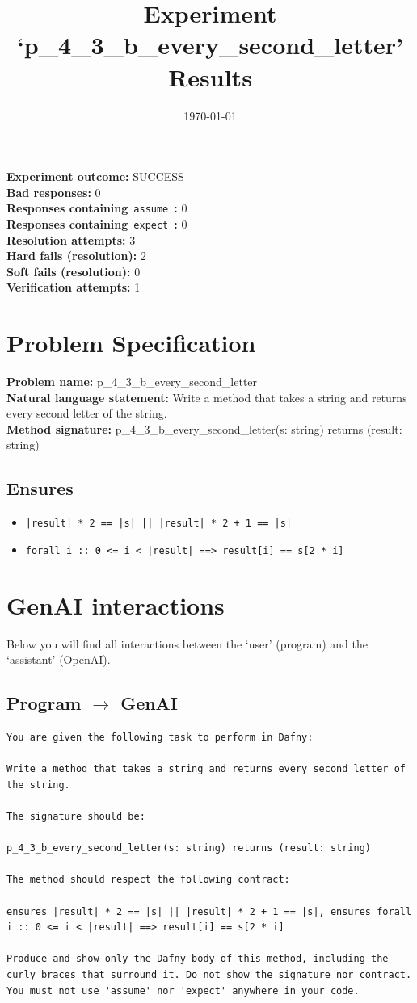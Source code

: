 \documentclass{article}
\begin{document}
\title{Experiment `p\_4\_3\_b\_every\_second\_letter' Results}
\author{\today}
\date{}
\maketitle
\textbf{Experiment outcome: }SUCCESS
\\\textbf{Bad responses: }0
\\\textbf{Responses containing}~\texttt{assume}~\textbf{: }0
\\\textbf{Responses containing}~\texttt{expect}~\textbf{: }0
\\\textbf{Resolution attempts: }3
\\\textbf{Hard fails (resolution): }2
\\\textbf{Soft fails (resolution): }0
\\\textbf{Verification attempts: }1
\section*{Problem Specification}
\textbf{Problem name: }p\_4\_3\_b\_every\_second\_letter
\\\textbf{Natural language statement: }Write a method that takes a string and returns every second letter of the string.
\\\textbf{Method signature: }p\_4\_3\_b\_every\_second\_letter(s: string) returns (result: string)
\subsection*{Ensures}
\begin{itemize}
\item \texttt{|result| * 2 == |s| || |result| * 2 + 1 == |s|}
\item \texttt{forall i :: 0 <= i < |result| ==> result[i] == s[2 * i]}
\end{itemize}
\clearpage
\section*{GenAI interactions}
Below you will find all interactions between the `user' (program) and the `assistant' (OpenAI).
\subsection*{Program $\rightarrow$ GenAI}
\begin{lstlisting}
You are given the following task to perform in Dafny:

Write a method that takes a string and returns every second letter of the string.

The signature should be:

p_4_3_b_every_second_letter(s: string) returns (result: string)

The method should respect the following contract:

ensures |result| * 2 == |s| || |result| * 2 + 1 == |s|, ensures forall i :: 0 <= i < |result| ==> result[i] == s[2 * i]

Produce and show only the Dafny body of this method, including the curly braces that surround it. Do not show the signature nor contract. You must not use 'assume' nor 'expect' anywhere in your code.
\end{lstlisting}
\end{document}
